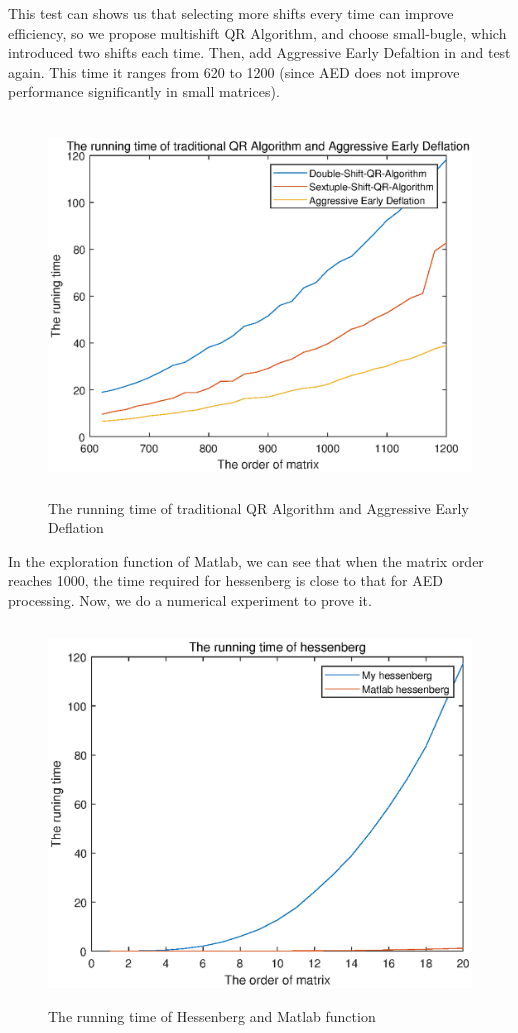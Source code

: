This test can shows us that selecting more shifts every time can improve efficiency, so we propose multishift QR Algorithm, and choose small-bugle, which introduced two shifts each time. Then, add Aggressive Early Defaltion in and test again. This time it ranges from 620 to 1200 (since AED does not improve performance significantly in small matrices).
\begin{figure}[H]
\centering
\includegraphics[height=10cm,width=15cm]{The running time of traditional QR Algorithm and Aggressive Early Deflation.eps}
\caption{The running time of traditional QR Algorithm and Aggressive Early Deflation}
\label{2}
\end{figure}

In the exploration function of Matlab, we can see that when the matrix order reaches 1000, the time required for hessenberg is close to that for AED processing. Now, we do a numerical experiment to prove it.
\begin{figure}[H]
\centering
\includegraphics[height=10cm,width=15cm]{Hessenberg.eps}
\caption{The running time of Hessenberg and Matlab function}
\label{3}
\end{figure}

